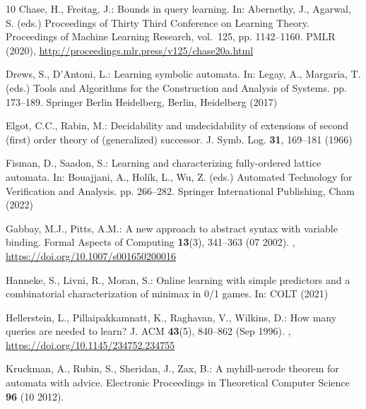 \documentclass[11pt,a4paper]{amsart}
\theoremstyle{definition}
\begin{document}
\begin{thebibliography}{10}
Chase, H., Freitag, J.: Bounds in query learning. In: Abernethy, J., Agarwal,
  S. (eds.) Proceedings of Thirty Third Conference on Learning Theory.
  Proceedings of Machine Learning Research, vol.~125, pp. 1142--1160. PMLR
  (2020), \url{http://proceedings.mlr.press/v125/chase20a.html}

Drews, S., D'Antoni, L.: Learning symbolic automata. In: Legay, A., Margaria,
  T. (eds.) Tools and Algorithms for the Construction and Analysis of Systems.
  pp. 173--189. Springer Berlin Heidelberg, Berlin, Heidelberg (2017)

Elgot, C.C., Rabin, M.: Decidability and undecidability of extensions of second
  (first) order theory of (generalized) successor. J. Symb. Log.  \textbf{31},
  169--181 (1966)

Fisman, D., Saadon, S.: Learning and characterizing fully-ordered lattice
  automata. In: Bouajjani, A., Hol{\'i}k, L., Wu, Z. (eds.) Automated
  Technology for Verification and Analysis. pp. 266--282. Springer
  International Publishing, Cham (2022)

Gabbay, M.J., Pitts, A.M.: A new approach to abstract syntax with variable
  binding. Formal Aspects of Computing  \textbf{13}(3),  341--363 (07 2002).
  , \url{https://doi.org/10.1007/s001650200016}

Hanneke, S., Livni, R., Moran, S.: Online learning with simple predictors and a
  combinatorial characterization of minimax in 0/1 games. In: COLT (2021)

Hellerstein, L., Pillaipakkamnatt, K., Raghavan, V., Wilkins, D.: How many
  queries are needed to learn? J. ACM  \textbf{43}(5),  840–862 (Sep 1996).
  , \url{https://doi.org/10.1145/234752.234755}

Kruckman, A., Rubin, S., Sheridan, J., Zax, B.: A myhill-nerode theorem for
  automata with advice. Electronic Proceedings in Theoretical Computer Science
  \textbf{96} (10 2012). 


\end{thebibliography}
\end{document}
